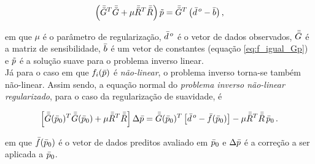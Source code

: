 \begin{equation}
\left(\bar{\bar{G}}^T\bar{\bar{G}} + \mu\bar{\bar{R}}^T\bar{\bar{R}}\right)\tilde{p} =
    \bar{\bar{G}}^T\left(\bar{d}^{\thinspace o} - \bar{b} \right) ,
\end{equation}

\noindent em que $\mu$ é o parâmetro de regularização, $\bar{d}^{\thinspace o}$
é o vetor de dados observados, $\bar{\bar{G}}$ é a matriz de sensibilidade, $\bar{b}$
é um vetor de constantes (equação \ref{eq:f_igual_Gp}) e $\tilde{p}$ é a solução
suave para o problema inverso linear.
\\
\indent Já para o caso em que $f_i(\bar{p})$ é {\it não-linear}, o problema
inverso torna-se também não-linear. Assim sendo, a equação normal do
{\it problema inverso não-linear regularizado}, para o caso da regularização de
suavidade, é

\begin{equation}
\left[\bar{\bar{G}}(\bar{p}_0)^T\bar{\bar{G}}(\bar{p}_0) +
      \mu\bar{\bar{R}}^T\bar{\bar{R}}\right]\Delta\bar{p} =
\bar{\bar{G}}(\bar{p}_0)^T \left[\bar{d}^{\thinspace o} - \bar{f}(\bar{p}_0)\right] -
\mu\bar{\bar{R}}^T\bar{\bar{R}}\thinspace\bar{p}_0
    \thinspace .
\end{equation}

\noindent em que $\bar{f}(\bar{p}_0)$ é o vetor de dados preditos avaliado em
$\bar{p}_0$ e $\Delta\bar{p}$ é a correção a ser aplicada a $\bar{p}_0$.
